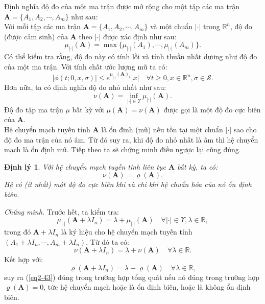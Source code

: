 \documentclass[14pt,a4paper,oneside]{report}		%
\newtheorem{theorem}{Định lý}[chapter]
\theoremstyle{definition}
\begin{document}
Định nghĩa độ đo của một ma trận được mở rộng cho một tập các ma trận $\mathbf{A}=\{A_1,A_2,\cdots,A_m\}$ như sau:\\
Với mỗi tập các ma trận $\mathbf{A}=\{A_1,A_2,\cdots,A_m\}$ và một chuẩn $|\cdot|$ trong $\mathbb{R}^n$, độ đo (được cảm sinh) của $\mathbf{A}$ theo $|\cdot|$ được xác định như sau:
\begin{equation} \label{eq2-40}
\mu_{|\cdot|}(\mathbf{A})=\max\{\mu_{|\cdot|}(A_1),\cdots,\mu_{|\cdot|}(A_m)\}.
\end{equation}
Có thể kiểm tra rằng, độ đo này có tính lồi và tính thuần nhất dương như độ đo của một ma trận. Với tính chất ước lượng mũ ta có:
\begin{equation} \label{eq2-41}
|\phi(t;0,x,\sigma)|\leq e^{\mu_{|\cdot|}(\mathbf{A})_t}|x|\quad\forall t\geq 0,x\in\mathbb{R}^n,\sigma\in\mathcal{S}.
\end{equation}
Hơn nữa, ta có định nghĩa độ đo nhỏ nhất như sau:
\begin{equation} \label{eq2-42}
\nu(\mathbf{A})=\inf_{|\cdot|\in\Upsilon}\mu_{|\cdot|}(\mathbf{A}).
\end{equation}
Độ đo tập ma trận $\mu$ bất kỳ với $\mu(\mathbf{A})=\nu(\mathbf{A})$ được gọi là một độ đo cực biên của $\mathbf{A}$.\\
Hệ chuyển mạch tuyến tính $\mathbf{A}$ là ổn đinh (mũ) nếu tồn tại một chuẩn $|\cdot|$ sao cho độ đo ma trận của nó âm. Từ đó suy ra, khi độ đo nhỏ nhất là âm thì hệ chuyển mạch là ổn định mũ. Tiếp theo ta sẽ chứng minh điều ngược lại cũng đúng.

\begin{theorem} \label{the2-26}
Với hệ chuyển mạch tuyến tính liên tục $\mathbf{A}$ bất kỳ, ta có:
\begin{equation} \label{eq2-43}
\nu(\mathbf{A})=\varrho(\mathbf{A}).
\end{equation}
Hệ có (ít nhất) một độ đo cực biên khi và chỉ khi hệ chuẩn hóa của nó ổn định biên.
\end{theorem}
\textit{Chứng minh.} Trước hết, ta kiểm tra:
$$\mu_{|\cdot|}(\mathbf{A}+\lambda I_n)=\lambda +\mu_{|\cdot|}(\mathbf{A})\quad\forall |\cdot|\in\Upsilon , \lambda\in\mathbb{R},$$
trong đó $\mathbf{A}+\lambda I_n$ là ký hiệu cho hệ chuyển mạch tuyến tính $(A_1+\lambda I_n,\cdots,A_m+\lambda I_n)$. Từ đó ta có:
$$\nu(\mathbf{A}+\lambda I_n)=\lambda +\nu(\mathbf{A})\quad\forall\lambda\in\mathbb{R}.$$
Kết hợp với:
$$\varrho(\mathbf{A}+\lambda I_n)=\lambda +\varrho (\mathbf{A})\quad\forall\lambda\in\mathbb{R},$$
suy ra (\ref{eq2-43}) đúng trong trường hợp tổng quát nếu nó đúng trong trường hợp $\varrho(\mathbf{A})=0$, tức hệ chuyển mạch hoặc là ổn định biên, hoặc là không ổn định biên.\\
\end{document}

